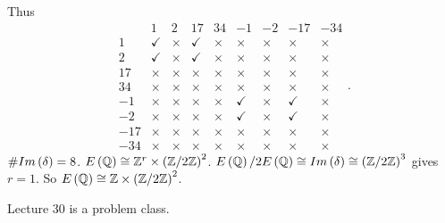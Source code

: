 Thus
$$
\begin{array}{c|cccc|cccc}
& 1 & 2 & 17 & 34 & -1 & -2 & -17 & -34 \\
\hline
1 & \checkmark & \times & \checkmark & \times & \times & \times & \times & \times \\
2 & \checkmark & \times & \checkmark & \times & \times & \times & \times & \times \\
17 & \times & \times & \times & \times & \times & \times & \times & \times \\
34 & \times & \times & \times & \times & \times & \times & \times & \times \\
\hline
-1 & \times & \times & \times & \times & \checkmark & \times & \checkmark & \times \\
-2 & \times & \times & \times & \times & \checkmark & \times & \checkmark & \times \\
-17 & \times & \times & \times & \times & \times & \times & \times & \times \\
-34 & \times & \times & \times & \times & \times & \times & \times & \times
\end{array}.
$$
$ \#Im\left( \delta \right) = 8 $. $ E\left( \mathbb{Q} \right) \cong \mathbb{Z}^r \times \left( \mathbb{Z} / 2\mathbb{Z} \right)^2 $. $ E\left( \mathbb{Q} \right) / 2E\left( \mathbb{Q} \right) \cong Im\left( \delta \right) \cong \left( \mathbb{Z} / 2\mathbb{Z} \right)^3 $ gives $ r = 1 $. So $ E\left( \mathbb{Q} \right) \cong \mathbb{Z} \times \left( \mathbb{Z} / 2\mathbb{Z} \right)^2 $.


Lecture 30 is a problem class.

